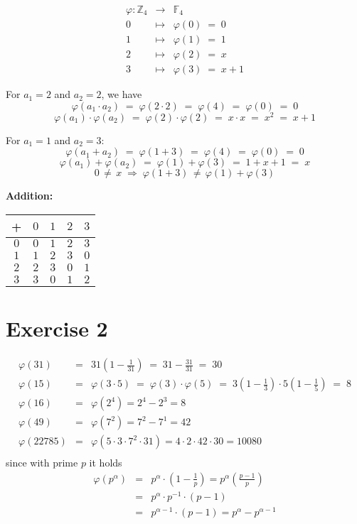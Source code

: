 \documentclass[a4paper]{scrreprt}
\newcommand\Z{\mathbb Z}
\newcommand\F{\mathbb F}
\begin{document}
\begin{eqnarray*}
    \varphi: \Z_4 &\rightarrow& \F_4\\
    0 &\mapsto& \varphi(0)\;=\;0\\
    1 &\mapsto& \varphi(1)\;=\;1\\
    2 &\mapsto& \varphi(2)\;=\;x\\
    3 &\mapsto& \varphi(3)\;=\;x+1
\end{eqnarray*}

For $a_1=2$ and $a_2=2$, we have
\[\varphi(a_1\cdot a_2) \;=\; \varphi(2\cdot 2) \;=\; \varphi(4) \;=\; \varphi(0) \;=\; 0\]
\[\varphi(a_1)\cdot\varphi(a_2)\;=\;\varphi(2)\cdot\varphi(2)\;=\;x\cdot x\;=\;x^2\;=\;x+1\]

For $a_1=1$ and $a_2=3$:
\[\varphi(a_1+a_2)\;=\;\varphi(1+3)\;=\;\varphi(4)\;=\;\varphi(0)\;=\;0\]
\[\varphi(a_1)+\varphi(a_2)\;=\;\varphi(1)+\varphi(3)\;=\;1+x+1\;=\;x\]
\[0\,\neq\, x \;\Rightarrow\; \varphi(1+3)\,\neq\,\varphi(1)+\varphi(3)\]

\vspace*{1em}
\textbf{Addition:}

\hspace*{1cm}\begin{tabular}{c||c|c|c|c}
    +  & $0$ & $1$ & $2$ & $3$ \\
    \hline
    \hline
    $0$ & $0$ & $1$ & $2$ & $3$ \\
    \hline
    $1$ & $1$ & $2$ & $3$ & $0$ \\
    \hline
    $2$ & $2$ & $3$ & $0$ & $1$ \\
    \hline
    $3$ & $3$ & $0$ & $1$ & $2$ \\
\end{tabular}

\section*{Exercise 2}

\begin{eqnarray*}
\varphi(31)&=&31\left(1-\frac{1}{31}\right)\;=\;31-\frac{31}{31} \;=\; 30\\
\varphi(15)&=&\varphi(3\cdot5)\;=\;\varphi(3)\cdot\varphi(5)\;=\;
        3\left(1-\frac 1 3\right)\cdot 5\left(1-\frac 1 5\right)\;=\;8\\
    \varphi(16) &=& \varphi(2^4) = 2^4-2^3=8\\[0.3em]
    \varphi(49) &=& \varphi(7^2)=7^2-7^1=42\\[0.3em]
    \varphi(22785) &=& \varphi(5\cdot3\cdot7^2\cdot31)=4\cdot2\cdot42\cdot30=10080\\
\end{eqnarray*}
since with prime $p$ it holds
\begin{eqnarray*}
    \varphi(p^\alpha)&=&p^\alpha\cdot\left(1-\frac 1 p\right)=p^\alpha\left(\frac{p-1}p\right)\\
    &=& p^\alpha\cdot p^{-1}\cdot (p-1)\\
    &=& p^{\alpha-1}\cdot (p-1)=p^{\alpha}-p^{\alpha-1}
\end{eqnarray*}
\end{document}
